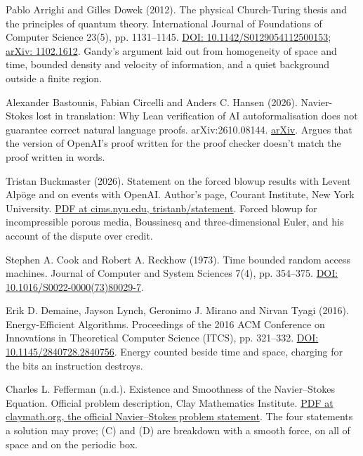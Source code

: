 \documentclass[11pt,twoside]{article}
\theoremstyle{thielethm}
\theoremstyle{thieledef}
\theoremstyle{thieledef}
\theoremstyle{thieledef}
\theoremstyle{thielethm}
\theoremstyle{thieleobs}
\theoremstyle{thielethm}
\begin{document}
\noindent Pablo Arrighi and Gilles Dowek (2012). The physical Church-Turing thesis and the principles of quantum theory. International Journal of Foundations of Computer Science 23(5), pp. 1131--1145. \href{https://doi.org/10.1142/S0129054112500153}{DOI: 10.1142/S0129054112500153}; \href{https://arxiv.org/abs/1102.1612}{arXiv: 1102.1612}. Gandy's argument laid out from homogeneity of space and time, bounded density and velocity of information, and a quiet background outside a finite region.
\par\medskip

\noindent Alexander Bastounis, Fabian Circelli and Anders C. Hansen (2026). Navier-Stokes lost in translation: Why Lean verification of AI autoformalisation does not guarantee correct natural language proofs. arXiv:2610.08144. \href{https://arxiv.org/abs/2610.08144}{arXiv}. Argues that the version of OpenAI's proof written for the proof checker doesn't match the proof written in words.
\par\medskip

\noindent Tristan Buckmaster (2026). Statement on the forced blowup results with Levent Alp\"oge and on events with OpenAI. Author's page, Courant Institute, New York University. \href{https://cims.nyu.edu/~tristanb/statement.pdf}{PDF at cims.nyu.edu, tristanb/statement}. Forced blowup for incompressible porous media, Boussinesq and three-dimensional Euler, and his account of the dispute over credit.
\par\medskip

\noindent Stephen A. Cook and Robert A. Reckhow (1973). Time bounded random access machines. Journal of Computer and System Sciences 7(4), pp. 354--375. \href{https://doi.org/10.1016/S0022-0000(73)80029-7}{DOI: 10.1016/S0022-0000(73)80029-7}.
\par\medskip

\noindent Erik D. Demaine, Jayson Lynch, Geronimo J. Mirano and Nirvan Tyagi (2016). Energy-Efficient Algorithms. Proceedings of the 2016 ACM Conference on Innovations in Theoretical Computer Science (ITCS), pp. 321--332. \href{https://doi.org/10.1145/2840728.2840756}{DOI: 10.1145/2840728.2840756}. Energy counted beside time and space, charging for the bits an instruction destroys.
\par\medskip

\noindent Charles L. Fefferman (n.d.). Existence and Smoothness of the Navier--Stokes Equation. Official problem description, Clay Mathematics Institute. \href{https://www.claymath.org/wp-content/uploads/2022/06/navierstokes.pdf}{PDF at claymath.org, the official Navier--Stokes problem statement}. The four statements a solution may prove; (C) and (D) are breakdown with a smooth force, on all of space and on the periodic box.
\par\medskip
\end{document}
